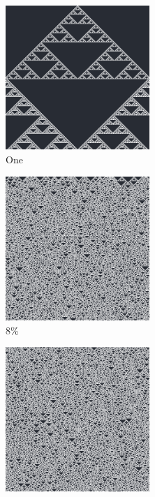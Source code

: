 \documentclass[12pt, fleqn]{report}                             %
\theoremstyle{break}                                            %
\begin{document}
      \begin{figure}[ht!]
        \centering
        \begin{subfigure}[b]{0.4\linewidth}
          \includegraphics[width=0.6\textwidth]{Images/126/a.png}
          \caption{One}
        \end{subfigure}
        \begin{subfigure}[b]{0.4\linewidth}
          \includegraphics[width=0.6\textwidth]{Images/126/b.png}
          \caption{8\%}
        \end{subfigure}
        \begin{subfigure}[b]{0.4\linewidth}
          \includegraphics[width=0.6\textwidth]{Images/126/c.png}

\end{subfigure}
\end{figure}
\end{document}
